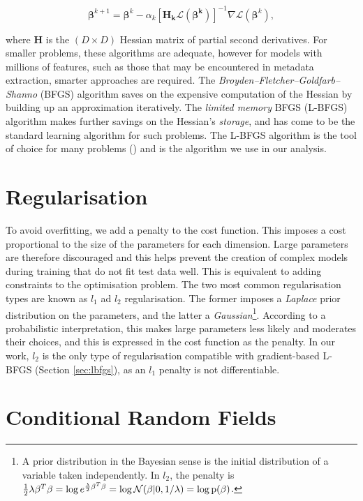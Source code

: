\begin{equation}
\boldsymbol\beta^{k+1} = \boldsymbol\beta^{k} - \alpha_k [\mathbf{H_k\mathcal{L}(\boldsymbol\beta^{k})}]^{-1}\nabla\mathcal{L}(\boldsymbol\beta^{k}),
\label{eq:newton}
\end{equation}

where $\mathbf{H}$ is the $(D \times D)$ Hessian matrix of partial second derivatives. For smaller problems, these algorithms are adequate, however for models with millions of features, such as those that may be encountered in metadata extraction, smarter approaches are required. The \emph{Broyden--Fletcher--Goldfarb--Shanno} (BFGS) algorithm saves on the expensive computation of the Hessian by building up an approximation iteratively. The \emph{limited memory} BFGS (L-BFGS) algorithm makes further savings on the Hessian's \emph{storage}, and has come to be the standard learning algorithm for such problems. The L-BFGS algorithm is the tool of choice for many problems (\cite{murphy2012machine}) and is the algorithm we use in our analysis.

\section{Regularisation}

To avoid overfitting, we add a penalty to the cost function. This imposes a cost proportional to the size of the parameters for each dimension. Large parameters are therefore discouraged and this helps prevent the creation of complex models during training that do not fit test data well. This is equivalent to adding constraints to the optimisation problem. The two most common regularisation types are known as $l_1$ ad $l_2$ regularisation. The former imposes a \emph{Laplace} prior distribution on the parameters, and the latter a \emph{Gaussian}\footnote{A prior distribution in the Bayesian sense is the initial distribution of a variable taken independently. In $l_2$, the penalty is $\frac{1}{2}\lambda\beta^T\beta = \log e^{\frac{\lambda}{2}\beta^T\beta} = \log \mathcal{N}(\beta|0, 1/\lambda) = \log\text{p}(\beta)$.}. According to a probabilistic interpretation, this makes large parameters less likely and moderates their choices, and this is expressed in the cost function as the penalty. In our work, $l_2$ is the only type of regularisation compatible with gradient-based L-BFGS (Section \ref{sec:lbfgs}), as an $l_1$ penalty is not differentiable.

\section{Conditional Random Fields}
\label{subsec:crfs}

